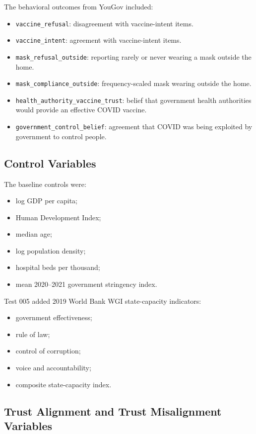 \documentclass[12pt]{article}
\begin{document}
The behavioral outcomes from YouGov included:

\begin{itemize}
  \item \texttt{vaccine\_refusal}: disagreement with vaccine-intent items.
  \item \texttt{vaccine\_intent}: agreement with vaccine-intent items.
  \item \texttt{mask\_refusal\_outside}: reporting rarely or never wearing a mask outside the home.
  \item \texttt{mask\_compliance\_outside}: frequency-scaled mask wearing outside the home.
  \item \texttt{health\_authority\_vaccine\_trust}: belief that government health authorities would provide an effective COVID vaccine.
  \item \texttt{government\_control\_belief}: agreement that COVID was being exploited by government to control people.
\end{itemize}

\subsection{Control Variables}

The baseline controls were:

\begin{itemize}
  \item log GDP per capita;
  \item Human Development Index;
  \item median age;
  \item log population density;
  \item hospital beds per thousand;
  \item mean 2020--2021 government stringency index.
\end{itemize}

Test 005 added 2019 World Bank WGI state-capacity indicators:

\begin{itemize}
  \item government effectiveness;
  \item rule of law;
  \item control of corruption;
  \item voice and accountability;
  \item composite state-capacity index.
\end{itemize}

\subsection{Trust Alignment and Trust Misalignment Variables}
\end{document}

